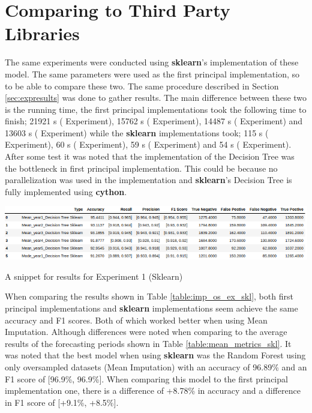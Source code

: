 \section{Comparing to Third Party Libraries}\label{sec:comparethird}
The same experiments were conducted using \textbf{sklearn}’s implementation of these model. The same parameters were used as the first principal implementation, so to be able to compare these two. The same procedure described in Section \ref{sec:expresults} was done to gather results. The main difference between these two is the running time, the first principal implementations took the following time to finish; 21921 s ( Experiment), 15762 s ( Experiment), 14487 s ( Experiment) and 13603 s ( Experiment) while the \textbf{sklearn} implementations took; 115 s ( Experiment), 60 s ( Experiment), 59 s ( Experiment) and 54 s ( Experiment). After some test it was noted that the implementation of the Decision Tree was the bottleneck in first principal implementation. This could be because no parallelization was used in the implementation and \textbf{sklearn}’s Decision Tree is fully implemented using \textbf{cython}. 
\begin{table}[H]
\centering
  \includegraphics[scale = .65]{imgs/imp_os_skl.png}
  \caption{A snippet for results for Experiment 1 (Sklearn)}
  \label{table:imp_os_ex_skl}
\end{table}
\noindent When comparing the results shown in Table \ref{table:imp_os_ex_skl}, both first principal implementations and \textbf{sklearn} implementations seem achieve the same accuracy and F1 scores. Both of which worked better when using Mean Imputation. Although differences were noted when comparing to the average results of the forecasting periods shown in Table \ref{table:mean_metrics_skl}. It was noted that the best model when using \textbf{sklearn} was the Random Forest using only oversampled datasets (Mean Imputation) with an accuracy of 96.89\% and an F1 score of [96.9\%, 96.9\%]. When comparing this model to the first principal implementation one, there is a difference of +8.78\% in accuracy and a difference in F1 score of [+9.1\%, +8.5\%].

